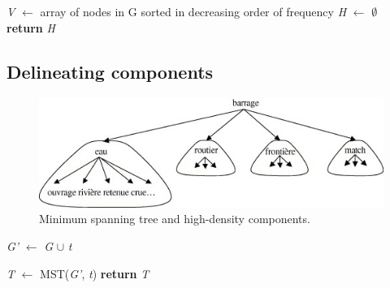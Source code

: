 \documentclass[article,dr=phil,type=drfinal,colorback,accentcolor=tud9c]{tudthesis}
\begin{document}
\begin{algorithm}[H]
	

 \textit{V} $\leftarrow$ array of nodes in G sorted in decreasing order of frequency\;
 \textit{H} $\leftarrow$ $\emptyset$\;
 \textbf{return} \textit{H}
\end{algorithm}

\subsection{Delineating components}
\begin{figure}[htb]
	\centering
	\includegraphics[]{images/delineate}
	\caption[Minimum spanning tree and high-density components.]{Minimum spanning tree and high-density components.}
	\label{fig:delineate}
\end{figure}


\begin{algorithm}[H]
	

 \textit{G'} $\leftarrow$ \textit{G} $\cup$ \textit{t} \;
 
 \textit{T} $\leftarrow$ MST(\textit{G'}, \textit{t}) \newline
 \textbf{return} \textit{T}
\end{algorithm}
\end{document}
